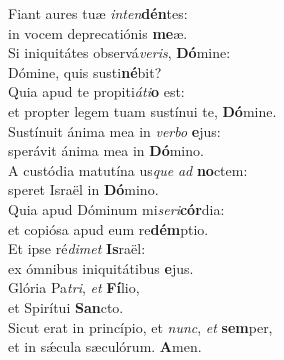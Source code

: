 \evenverse Fiant aures tuæ \textit{in}\textit{ten}\textbf{dén}tes:~\*\\
\evenverse in vocem deprecatiónis \textbf{me}æ.\\
\oddverse Si iniquitátes observá\textit{ve}\textit{ris}, \textbf{Dó}mine:~\*\\
\oddverse Dómine, quis susti\textbf{né}bit?\\
\evenverse Quia apud te propiti\textit{á}\textit{ti}\textbf{o} est:~\*\\
\evenverse et propter legem tuam sustínui te, \textbf{Dó}mine.\\
\oddverse Sustínuit ánima mea in \textit{ver}\textit{bo} \textbf{e}jus:~\*\\
\oddverse sperávit ánima mea in \textbf{Dó}mino.\\
\evenverse A custódia matutína us\textit{que} \textit{ad} \textbf{no}ctem:~\*\\
\evenverse speret Israël in \textbf{Dó}mino.\\
\oddverse Quia apud Dóminum mi\textit{se}\textit{ri}\textbf{cór}dia:~\*\\
\oddverse et copiósa apud eum re\textbf{dém}ptio.\\
\evenverse Et ipse ré\textit{di}\textit{met} \textbf{Is}raël:~\*\\
\evenverse ex ómnibus iniquitátibus \textbf{e}jus.\\
\oddverse Glória Pa\textit{tri}, \textit{et} \textbf{Fí}lio,~\*\\
\oddverse et Spirítui \textbf{San}cto.\\
\evenverse Sicut erat in princípio, et \textit{nunc}, \textit{et} \textbf{sem}per,~\*\\
\evenverse et in sǽcula sæculórum. \textbf{A}men.\\
